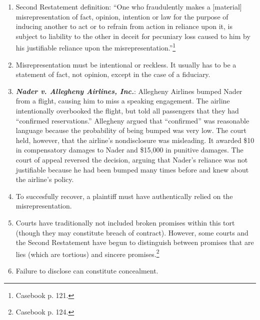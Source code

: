 \begin{enumerate}
    \item Second Restatement definition: ``One who fraudulently makes a [material] misrepresentation of fact, opinion, intention or law for the purpose of inducing another to act or to refrain from action in reliance upon it, is subject to liability to the other in deceit for pecuniary loss caused to him by his justifiable reliance upon the misrepresentation.''\footnote{Casebook p. 121.}
    \item Misrepresentation must be intentional or reckless. It usually has to be a statement of fact, not opinion, except in the case of a fiduciary. 
    \item \textbf{\emph{Nader v. Allegheny Airlines, Inc.}}: Allegheny Airlines bumped Nader from a flight, causing him to miss a speaking engagement. The airline intentionally overbooked the flight, but told all passengers that they had ``confirmed reservations.'' Allegheny argued that ``confirmed'' was reasonable language because the probability of being bumped was very low. The court held, however, that the airline's nondisclosure was misleading. It awarded \$10 in compensatory damages to Nader and \$15,000 in punitive damages. The court of appeal reversed the decision, arguing that Nader's reliance was not justifiable because he had been bumped many times before and knew about the airline's policy.
    \item To succesfully recover, a plaintiff must have authentically relied on the misrepresentation.
    \item Courts have traditionally not included broken promises within this tort (though they may constitute breach of contract). However, some courts and the Second Restatement have begun to distinguish between promises that are lies (which are tortious) and sincere promises.\footnote{Casebook p. 124.}
    \item Failure to disclose can constitute concealment.
\end{enumerate}


